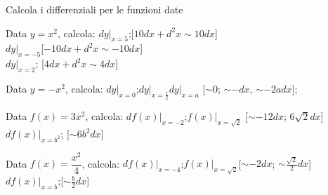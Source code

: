 \begin{esercizio}\label{ese:dif05}
Calcola i differenziali per le funzioni date
\begin{enumeratea}
  \item  Data $y=x^2$, calcola:
  $dy|_{x=5}$;\hfill [$10dx+d^2x\sim 10dx$]\\
  $dy|_{x=-5}$\hfill [$-10dx+d^2x\sim -10 dx$]\\
  $dy|_{x=2}$; \hfill [$4dx+d^2x\sim 4dx$]
  \item Data $y=-x^2$, calcola:
  $dy|_{x=0}$;\hspace{3em}$dy|_{x=\frac{1}{2}}$\hspace{3em}$dy|_{x=a}$
  \hfill [$\sim 0$; $\sim -dx$, $\sim -2adx$];
  \item Data $f(x)=3x^2$, calcola:
  $df(x)|_{x=-2}$;\hspace{3em}$f(x)|_{x=\sqrt{2}}$
  \hfill [$\sim -12dx$; $6\sqrt{2}dx$]\\
  $df(x)|_{x=b^2}$; \hfill [$\sim 6b^2dx$]
  \item Data $f(x)=\dfrac{x^2}{4}$, calcola:
  $df(x)|_{x=-4}$;\hspace{3em}$f(x)|_{x=\sqrt{2}}$\hfill [$\sim-2dx$; 
  $\sim \frac{\sqrt{2}}{2}dx$]\\
  $df(x)|_{x=b}$;\hfill [$\sim\frac{b}{2}dx$]
 \end{enumeratea}
\end{esercizio}

